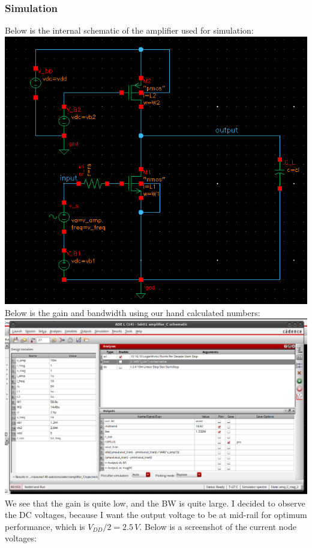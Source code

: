 \documentclass[12pt, fleqn]{article}
\begin{document}
\subsubsection{Simulation}
Below is the internal schematic of the amplifier used for simulation:\\[0.1cm]
\includegraphics[scale=0.55, center]{c_internal.png}\\[0.25cm]
Below is the gain and bandwidth using our hand calculated numbers:\\[0.1cm]
\includegraphics[scale=0.4, center]{c_gain_bw_init.png}
\newpage\noindent
We see that the gain is quite low, and the BW is quite large.  I decided to observe the DC voltages, because I want the output voltage to be at mid-rail for optimum performance, which is $V_{DD} / 2 = 2.5\,V$.  Below is a screenshot of the current node voltages:\\[0.1cm]
\end{document}
